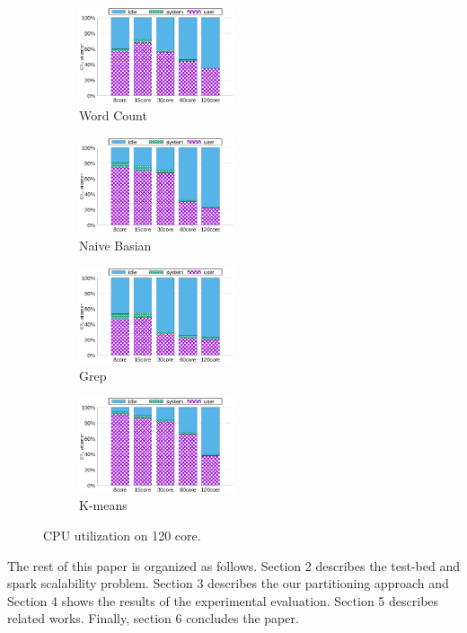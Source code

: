 \begin{figure}[tb]
    \centering
    \begin{subfigure}[b]{0.25\textwidth}
        \includegraphics[width=1.8in]{graph/wc_cpuutils.eps}
        \caption{Word Count}
    \end{subfigure}%
    \begin{subfigure}[b]{0.25\textwidth}
        \includegraphics[width=1.8in]{graph/nb_cpuutils.eps}
        \caption{Naive Basian}
    \end{subfigure}%
    \begin{subfigure}[b]{0.25\textwidth}
        \includegraphics[width=1.8in]{graph/grep_cpuutils.eps}
        \caption{Grep}
    \end{subfigure}%
    \begin{subfigure}[b]{0.25\textwidth}
        \includegraphics[width=1.8in]{graph/kmeans_cpuutils.eps}
        \caption{K-means}
    \end{subfigure}%
        \centering
    \caption{CPU utilization on 120 core.}
    \label{fig:cpuutilization}
\end{figure}

The rest of this paper is organized as follows.
Section 2 describes the test-bed and spark scalability problem.
Section 3 describes the our partitioning approach and 
Section 4 shows the results of the experimental evaluation. 
Section 5 describes related works. 
Finally, section 6 concludes the paper.

